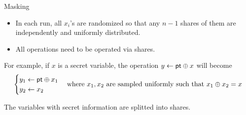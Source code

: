 \begin{frame}{Masking}

\begin{itemize}
\item In each run, all $x_i$'s are randomized so that any $n-1$ shares of them are independently and uniformly distributed.
\pause
\item All operations need to be operated via shares.
\end{itemize}
\pause
For example, if $x$ is a secret variable, the operation $y \gets {\sf pt} \oplus x$ will become 
\[
	\begin{cases} y_1 \gets {\sf pt} \oplus x_1 \\ y_2 \gets x_2  \end{cases} \text{where } x_1,x_2 \text{ are sampled uniformly such that } x_1 \oplus x_2 = x
\]

The variables with secret information are splitted into shares.

\end{frame}
